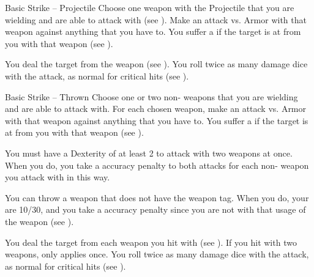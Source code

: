         \begin{activeability}{Basic Strike -- Projectile}
            \label{Projectile Strike}
            \rankline
            Choose one weapon with the Projectile  that you are wielding and are able to attack with (see ).
            Make an attack vs. Armor with that weapon against anything that you have  to.
            You suffer a  if the target is at  from you with that weapon (see ).

            \hit You deal the target  from the weapon (see ).
            \crit You roll twice as many damage dice with the attack, as normal for critical hits (see ).
        \end{activeability}

        \begin{activeability}{Basic Strike -- Thrown}
            \label{Thrown Strike}
            \rankline
            Choose one or two non- weapons that you are wielding and are able to attack with.
            For each chosen weapon, make an attack vs. Armor with that weapon against anything that you have  to.
            You suffer a  if the target is at  from you with that weapon (see ).

            You must have a Dexterity of at least 2 to attack with two weapons at once.
            When you do, you take a  accuracy penalty to both attacks for each non- weapon you attack with in this way.

            You can throw a weapon that does not have the  weapon tag.
            When you do, your  are 10/30, and you take a  accuracy penalty since you are not  with that usage of the weapon (see ).

            \hit You deal the target  from each weapon you hit with (see ).
            If you hit with two weapons,  only applies once.
            \crit You roll twice as many damage dice with the attack, as normal for critical hits (see ).
        \end{activeability}

